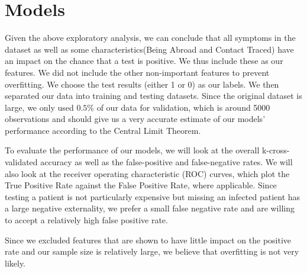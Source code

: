 \documentclass[a4paper, 11pt]{article}
\begin{document}
\section*{Models}
Given the above exploratory analysis, we can conclude that all symptoms in the dataset as well as some characteristics(Being Abroad and Contact Traced) have an impact on the chance that a test is positive. We thus include these as our features. We did not include the other non-important features to prevent overfitting. We choose the test results (either 1 or 0) as our labels. We then separated our data into training and testing datasets. Since the original dataset is large, we only used $0.5\%$ of our data for validation, which is around 5000 observations and should give us a very accurate estimate of our models' performance according to the Central Limit Theorem. \par
To evaluate the performance of our models, we will look at the overall k-cross-validated accuracy as well as the false-positive and false-negative rates. We will also look at the receiver operating characteristic (ROC) curves, which plot the True Positive Rate against the False Positive Rate, where applicable. Since testing a patient is not particularly expensive but missing an infected patient has a large negative externality, we prefer a small false negative rate and are willing to accept a relatively high false positive rate. \par
Since we excluded features that are shown to have little impact on the positive rate and our sample size is relatively large, we believe that overfitting is not very likely.
\end{document}
